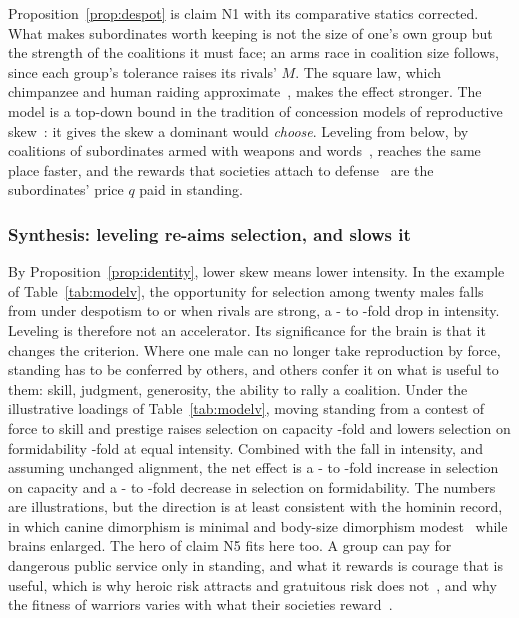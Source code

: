 Proposition~\ref{prop:despot} is claim N1 with its comparative statics corrected. What makes subordinates worth keeping is
not the size of one's own group but the strength of the coalitions it must face; an arms race in coalition size follows,
since each group's tolerance raises its rivals' $M$. The square law, which chimpanzee and human raiding
approximate~\cite{wilson2002,wilson2014,johnson2015}, makes the effect stronger. The model is a top-down bound in the tradition of
concession models of reproductive skew~\cite{vehrencamp1983,johnstone2000}: it gives the skew a dominant would \emph{choose}. Leveling from below, by coalitions of subordinates armed with weapons and
words~\cite{boehm1999,gavrilets2012,pandit2003}, reaches the same place faster, and the rewards that societies attach to
defense~\cite{glowacki2013} are the subordinates' price $q$ paid in standing.

\subsubsection{Synthesis: leveling re-aims selection, and slows it} By Proposition~\ref{prop:identity}, lower skew means
lower intensity. In the example of Table~\ref{tab:modelv}, the opportunity for selection among twenty males falls from
\DesIdespot{} under despotism to \DesILin{} or \DesISq{} when rivals are strong, a \DesIntLo- to \DesIntHi-fold drop in intensity.
Leveling is therefore not an accelerator. Its significance for the brain is that it changes the criterion. Where one male
can no longer take reproduction by force, standing has to be conferred by others, and others confer it on what is useful to
them: skill, judgment, generosity, the ability to rally a coalition. Under the illustrative loadings of
Table~\ref{tab:modelv}, moving standing from a contest of force to skill and prestige raises selection on capacity
\AimGain-fold and lowers selection on formidability \AimLoss-fold at equal intensity. Combined with the fall in intensity, and assuming
unchanged alignment, the net effect is a \NetGLo- to \NetGHi-fold increase in selection on capacity and a \NetFLo- to \NetFHi-fold decrease in selection
on formidability. The numbers are illustrations, but the direction is at least consistent with the hominin record, in which canine dimorphism
is minimal and body-size dimorphism modest~\cite{plavcan2012} while brains enlarged. The hero of claim N5 fits here too. A group can pay for dangerous public service
only in standing, and what it rewards is courage that is useful, which is why heroic risk attracts and gratuitous risk does
not~\cite{farthing2005}, and why the fitness of warriors varies with what their societies
reward~\cite{glowacki2013,glowacki2015,beckerman2009}.

